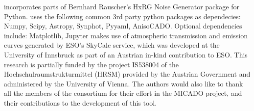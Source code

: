 \ScopeSim{} incorporates parts of Bernhard Rauscher's HxRG Noise Generator package for Python\cite{nghxrg}.
\ScopeSim{} uses the following common 3rd party python packages as dependecies: Numpy\cite{numpy}, Scipy\cite{scipy}, Astropy\cite{astropy1, astropy2}, Synphot\cite{synphot}, Pyyaml, AnisoCADO\cite{anisocado}.
Optional dependencies include: Matplotlib\cite{matplotlib}, Jupyter\cite{jupyter}
\ScopeSim{} makes use of atmospheric transmission and emission curves generated by ESO's SkyCalc service, which was developed at the University of Innsbruck as part of an Austrian in-kind contribution to ESO\cite{skycalc1, skycalc2}.
This research is partially funded by the project IS538004 of the Hochschulraumstrukturmittel (HRSM) provided by the Austrian Government and administered by the University of Vienna.
The authors would also like to thank all the members of the consortium for their effort in the MICADO project, and their contributions to the development of this tool.
